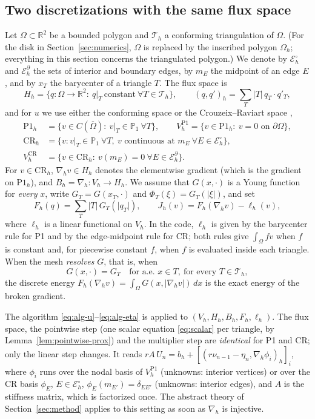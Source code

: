 \documentclass[11pt]{amsart}
\theoremstyle{definition}
\theoremstyle{remark}
\numberwithin{equation}{section}
\newcommand{\R}{\mathbb{R}}
\newcommand{\dx}{\,dx}
\newcommand{\abs}[1]{\lvert #1\rvert}
\newcommand{\CR}{\mathrm{CR}}
\newcommand{\Pone}{\mathrm{P1}}
\newcommand{\Th}{\mathcal T_h}
\newcommand{\Eb}{\mathcal E_h^{\partial}}
\newcommand{\Ei}{\mathcal E_h^{\circ}}
\begin{document}
\subsection{Two discretizations with the same flux space}\label{ssec:discretisation}
Let $\Omega\subset\R^2$ be a bounded polygon and $\Th$ a conforming triangulation of $\Omega$. (For the disk in Section~\ref{sec:numerics}, $\Omega$ is replaced by the inscribed polygon $\Omega_h$; everything in this section concerns the triangulated polygon.) We denote by $\Ei$ and $\Eb$ the sets of interior and boundary edges, by $m_E$ the midpoint of an edge $E$, and by $x_T$ the barycenter of a triangle $T$. The flux space is
\[
H_h=\{q\colon\Omega\to\R^2:\ q|_T\ \text{constant}\ \forall T\in\Th\},\qquad (q,q')_h=\sum_T\abs T\,q_T\cdot q'_T ,
\]
and for $u$ we use either the conforming space or the Crouzeix--Raviart space \cite{CrouzeixRaviart1973},
\[
\begin{aligned}
\Pone_h&=\{v\in C(\overline\Omega):\ v|_T\in\mathbb P_1\ \forall T\},\qquad V_h^{\Pone}=\{v\in \Pone_h:\ v=0\text{ on }\partial\Omega\},\\
\CR_h&=\{v\colon v|_T\in\mathbb P_1\ \forall T,\ v\text{ continuous at }m_E\ \forall E\in\Ei\},\\
V_h^{\CR}&=\{v\in\CR_h:\ v(m_E)=0\ \forall E\in\Eb\}.
\end{aligned}
\]
For $v\in\CR_h$, $\nabla_hv\in H_h$ denotes the elementwise gradient (which is the gradient on $\Pone_h$), and $B_h=\nabla_h\colon V_h\to H_h$. We assume that $G(x,\cdot)$ is a Young function for \emph{every} $x$, write $G_T=G(x_T,\cdot)$ and $\Phi_T(\xi)=G_T(\abs\xi)$, and set
\[
F_h(q)=\sum_T\abs T\,G_T(\abs{q_T}),\qquad J_h(v)=F_h(\nabla_hv)-\ell_h(v),
\]
where $\ell_h$ is a linear functional on $V_h$. In the code, $\ell_h$ is given by the barycenter rule for P1 and by the edge-midpoint rule for CR; both rules give $\int_\Omega fv$ when $f$ is constant and, for piecewise constant $f$, when $f$ is evaluated inside each triangle. When the mesh \emph{resolves} $G$, that is, when
\begin{equation}\label{eq:resolved}
G(x,\cdot)=G_T\quad\text{for a.e.\ }x\in T,\ \text{for every }T\in\Th,
\end{equation}
the discrete energy $F_h(\nabla_hv)=\int_\Omega G(x,\abs{\nabla_hv})\dx$ is the exact energy of the broken gradient.

The algorithm \eqref{eq:alg-u}--\eqref{eq:alg-eta} is applied to $(V_h,H_h,B_h,F_h,\ell_h)$. The flux space, the pointwise step (one scalar equation \eqref{eq:scalar} per triangle, by Lemma~\ref{lem:pointwise-prox}) and the multiplier step are \emph{identical} for P1 and CR; only the linear step changes. It reads $rA\,U_n=b_h+[(r\nu_{n-1}-\eta_n,\nabla_h\phi_i)_h]_i$, where $\phi_i$ runs over the nodal basis of $V_h^{\Pone}$ (unknowns: interior vertices) or over the CR basis $\phi_E$, $E\in\Ei$, $\phi_E(m_{E'})=\delta_{EE'}$ (unknowns: interior edges), and $A$ is the stiffness matrix, which is factorized once. The abstract theory of Section~\ref{sec:method} applies to this setting as soon as $\nabla_h$ is injective.
\end{document}
